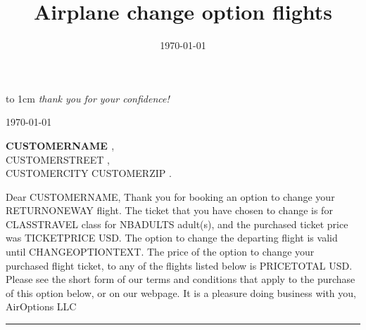 \documentclass[a4paper]{article}
\title{Airplane change option flights}
\date{\today }
\makeatletter
\let\displayFont\relax
\let\thetitle\@title
\makeatother
\begin{document}
\parbox[b][2cm][t]{\rightalignment}{{\color{gray!95}\displayFont\fontsize{1.5cm}{1.5cm}\selectfont %
\vbox to 1cm{\vss %
%
\companyname{}%
%
}}
\vskip 3mm%
{\fontsize{0.44cm}{0.5cm}%
\emph{thank you for your confidence!}%
}
}%
%
\parbox[b][2cm][t]{0.35\textwidth}{}

\kern -5mm

\leavevmode\kern \rightalignment \parbox{0.35\textwidth}{
  \today }

\vskip 0.7cm

\leavevmode\kern \rightalignment\kern -3mm \colorbox{gray!85}{
  \kern 1mm\begin{minipage}[t]{0.5\textwidth}
    \color{white}
    \vskip 2mm
    \textbf{ {{ CUSTOMERNAME }} },\\
    {{ CUSTOMERSTREET }} ,\\
    {{ CUSTOMERCITY }}
    {{ CUSTOMERZIP }}.\\
    \vspace*{-3mm}%
  \end{minipage}
}

\vskip 1cm
\noindent
Dear CUSTOMERNAME,
\vskip 5mm
\noindent
Thank you for booking an option to change your RETURNONEWAY flight.
The ticket that you have chosen to change is for CLASSTRAVEL class
for NBADULTS adult(s), and the purchased ticket price was
TICKETPRICE USD.
The option to change the departing flight is valid until
CHANGEOPTIONTEXT.
The price of the option to change your purchased flight ticket, to any of the flights listed below
is PRICETOTAL USD.
Please see the short form of our terms and conditions that apply to the purchase of this
option below, or on our webpage.
\vskip 5mm
\noindent
It is a pleasure doing business with you,
\\
AirOptions LLC

\vskip 2.3cm

\begin{center}
{\ttfamily\LARGE \thetitle}

\rule{2cm}{0.25pt}
\end{center}
\end{document}
